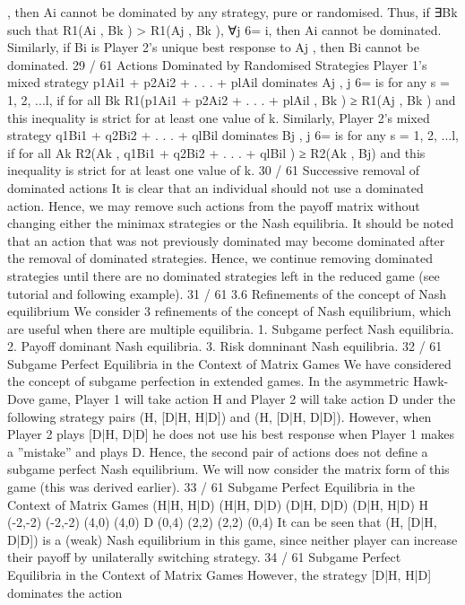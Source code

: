 , then Ai cannot be
dominated by any strategy, pure or randomised.
Thus, if ∃Bk such that R1(Ai
, Bk ) > R1(Aj
, Bk ), ∀j 6= i, then Ai
cannot be dominated.
Similarly, if Bi
is Player 2’s unique best response to Aj
, then Bi
cannot be dominated.
29 / 61
Actions Dominated by Randomised Strategies
Player 1’s mixed strategy p1Ai1 + p2Ai2 + . . . + plAil
dominates Aj
,
j 6= is for any s = 1, 2, ...l, if for all Bk
R1(p1Ai1 + p2Ai2 + . . . + plAil
, Bk ) ≥ R1(Aj
, Bk )
and this inequality is strict for at least one value of k.
Similarly, Player 2’s mixed strategy q1Bi1 + q2Bi2 + . . . + qlBil
dominates Bj
, j 6= is for any s = 1, 2, ...l, if for all Ak
R2(Ak , q1Bi1 + q2Bi2 + . . . + qlBil
) ≥ R2(Ak , Bj)
and this inequality is strict for at least one value of k.
30 / 61
Successive removal of dominated actions
It is clear that an individual should not use a dominated action.
Hence, we may remove such actions from the payoff matrix without
changing either the minimax strategies or the Nash equilibria.
It should be noted that an action that was not previously
dominated may become dominated after the removal of dominated
strategies.
Hence, we continue removing dominated strategies until there are
no dominated strategies left in the reduced game (see tutorial and
following example).
31 / 61
3.6 Refinements of the concept of Nash equilibrium
We consider 3 refinements of the concept of Nash equilibrium,
which are useful when there are multiple equilibria.
1. Subgame perfect Nash equilibria.
2. Payoff dominant Nash equilibria.
3. Risk domninant Nash equilibria.
32 / 61
Subgame Perfect Equilibria in the Context of Matrix Games
We have considered the concept of subgame perfection in extended
games.
In the asymmetric Hawk-Dove game, Player 1 will take action H
and Player 2 will take action D under the following strategy pairs
(H, [D|H, H|D]) and (H, [D|H, D|D]).
However, when Player 2 plays [D|H, D|D] he does not use his best
response when Player 1 makes a ”mistake” and plays D. Hence,
the second pair of actions does not define a subgame perfect Nash
equilibrium.
We will now consider the matrix form of this game (this was
derived earlier).
33 / 61
Subgame Perfect Equilibria in the Context of Matrix Games
(H|H, H|D) (H|H, D|D) (D|H, D|D) (D|H, H|D)
H (-2,-2) (-2,-2) (4,0) (4,0)
D (0,4) (2,2) (2,2) (0,4)
It can be seen that (H, [D|H, D|D]) is a (weak) Nash equilibrium
in this game, since neither player can increase their payoff by
unilaterally switching strategy.
34 / 61
Subgame Perfect Equilibria in the Context of Matrix Games
However, the strategy [D|H, H|D] dominates the action
